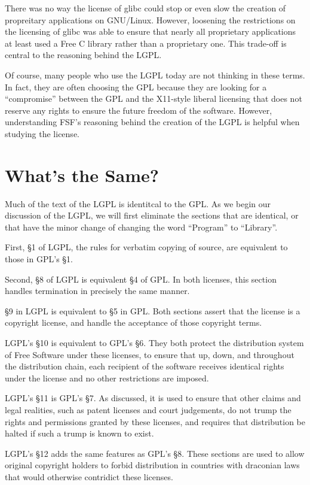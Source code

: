 \documentclass[12pt]{report}
\begin{document}
There was no way the license of glibc could stop or even slow the creation
of propreitary applications on GNU/Linux.  However, loosening the
restrictions on the licensing of glibc was able to ensure that nearly all
proprietary applications at least used a Free C library rather than a
proprietary one.  This trade-off is central to the reasoning behind the
LGPL\@.

Of course, many people who use the LGPL today are not thinking in these
terms.  In fact, they are often choosing the GPL because they are looking
for a ``compromise'' between the GPL and the X11-style liberal licensing
that does not reserve any rights to ensure the future freedom of the
software.  However, understanding FSF's reasoning behind the creation of
the LGPL is helpful when studying the license.


\section{What's the Same?}

Much of the text of the LGPL is identitcal to the GPL\@.  As we begin our
discussion of the LGPL, we will first eliminate the sections that are
identical, or that have the minor change of changing the word ``Program''
to ``Library''.

First, \S 1 of LGPL, the rules for verbatim copying of source, are
equivalent to those in GPL's \S 1.

Second, \S 8 of LGPL is equivalent \S 4 of GPL\@.  In both licenses, this
section handles termination in precisely the same manner.

\S 9 in LGPL is equivalent to \S 5 in GPL\@.  Both sections assert that
the license is a copyright license, and handle the acceptance of those
copyright terms.

LGPL's \S 10 is equivalent to GPL's \S 6.  They both protect the
distribution system of Free Software under these licenses, to ensure that
up, down, and throughout the distribution chain, each recipient of the
software receives identical rights under the license and no other
restrictions are imposed.

LGPL's \S 11 is GPL's \S 7.  As discussed, it is used to ensure that
other claims and legal realities, such as patent licenses and court
judgements, do not trump the rights and permissions granted by these
licenses, and requires that distribution be halted if such a trump is
known to exist.

LGPL's \S 12 adds the same features as GPL's \S 8.  These sections are
used to allow original copyright holders to forbid distribution in
countries with draconian laws that would otherwise contridict these
licenses.
\end{document}
